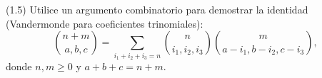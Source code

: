 
(1.5) Utilice un argumento combinatorio para demostrar la identidad (Vandermonde para coeficientes trinomiales):
\[
  \binom{n+m}{a,b,c}
  = \sum_{i_1+i_2+i_3=n}
    \binom{n}{i_1,i_2,i_3}
    \binom{m}{a-i_1,b-i_2,c-i_3},
\]
donde $n,m\ge0$ y $a+b+c=n+m$.

